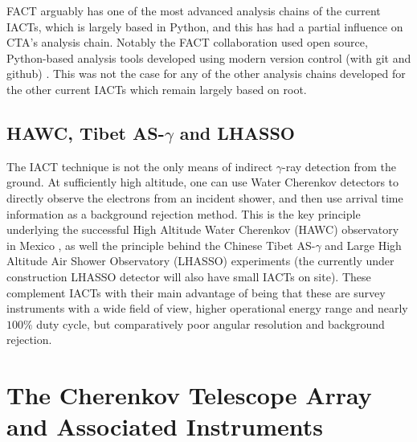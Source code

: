 FACT arguably has one of the most advanced analysis chains of the current IACTs, which is largely based in Python, and this has had a partial influence on CTA's analysis chain. Notably the FACT collaboration used open source, Python-based analysis tools developed using modern version control (with git and github) \cite{factspec}. This was not the case for any of the other analysis chains developed for the other current IACTs which remain largely based on root.

\subsection{HAWC, Tibet AS-\ensuremath{\gamma} and LHASSO}

The IACT technique is not the only means of indirect $\gamma$-ray detection from the ground. At sufficiently high altitude, one can use Water Cherenkov detectors to directly observe the electrons from an incident shower, and then use arrival time information as a background rejection method. This is the key principle underlying the successful High Altitude Water Cherenkov (HAWC) observatory in Mexico \cite{hawc}, as well the principle behind the Chinese Tibet AS-$\gamma$ \cite{asgamma} and Large High Altitude Air Shower Observatory (LHASSO) \cite{lhassocrab} experiments (the currently under construction LHASSO detector will also have small IACTs on site). These complement IACTs with their main advantage of being that these are survey instruments with a wide field of view, higher operational energy range and nearly $100\%$ duty cycle, but comparatively poor angular resolution and background rejection. 

\section{The Cherenkov Telescope Array and Associated Instruments}
